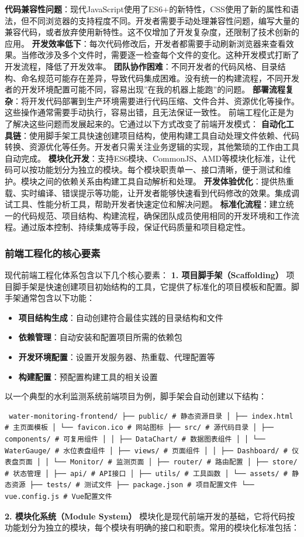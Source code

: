 \textbf{代码兼容性问题}：现代JavaScript使用了ES6+的新特性，CSS使用了新的属性和语法，但不同浏览器的支持程度不同。开发者需要手动处理兼容性问题，编写大量的兼容代码，或者放弃使用新特性。这不仅增加了开发复杂度，还限制了技术创新的应用。 \textbf{开发效率低下}：每次代码修改后，开发者都需要手动刷新浏览器来查看效果。当修改涉及多个文件时，需要逐一检查每个文件的变化。这种开发模式打断了开发流程，降低了开发效率。 \textbf{团队协作困难}：不同开发者的代码风格、目录结构、命名规范可能存在差异，导致代码集成困难。没有统一的构建流程，不同开发者的开发环境配置可能不同，容易出现''在我的机器上能跑''的问题。 \textbf{部署流程复杂}：将开发代码部署到生产环境需要进行代码压缩、文件合并、资源优化等操作。这些操作通常需要手动执行，容易出错，且无法保证一致性。 前端工程化正是为了解决这些问题而发展起来的。它通过以下方式改变了前端开发模式： \textbf{自动化工具链}：使用脚手架工具快速创建项目结构，使用构建工具自动处理文件依赖、代码转换、资源优化等任务。开发者只需关注业务逻辑的实现，其他繁琐的工作由工具自动完成。 \textbf{模块化开发}：支持ES6模块、CommonJS、AMD等模块化标准，让代码可以按功能划分为独立的模块。每个模块职责单一、接口清晰，便于测试和维护。模块之间的依赖关系由构建工具自动解析和处理。 \textbf{开发体验优化}：提供热重载、实时编译、错误提示等功能，让开发者能够快速看到代码修改的效果。集成调试工具、性能分析工具，帮助开发者快速定位和解决问题。 \textbf{标准化流程}：建立统一的代码规范、项目结构、构建流程，确保团队成员使用相同的开发环境和工作流程。通过版本控制、持续集成等手段，保证代码质量和项目稳定性。 \subsubsection{前端工程化的核心要素}\label{ux524dux7aefux5de5ux7a0bux5316ux7684ux6838ux5fc3ux8981ux7d20} 现代前端工程化体系包含以下几个核心要素： \textbf{1. 项目脚手架（Scaffolding）} 项目脚手架是快速创建项目初始结构的工具，它提供了标准化的项目模板和配置。脚手架通常包含以下功能： \begin{itemize} \item \textbf{项目结构生成}：自动创建符合最佳实践的目录结构和文件 \item \textbf{依赖管理}：自动安装和配置项目所需的依赖包 \item \textbf{开发环境配置}：设置开发服务器、热重载、代理配置等 \item \textbf{构建配置}：预配置构建工具的相关设置 \end{itemize} 以一个典型的水利监测系统前端项目为例，脚手架会自动创建以下结构： \begin{verbatim} water-monitoring-frontend/ ├── public/ # 静态资源目录 │ ├── index.html # 主页面模板 │ └── favicon.ico # 网站图标 ├── src/ # 源代码目录 │ ├── components/ # 可复用组件 │ │ ├── DataChart/ # 数据图表组件 │ │ └── WaterGauge/ # 水位表盘组件 │ ├── views/ # 页面组件 │ │ ├── Dashboard/ # 仪表盘页面 │ │ └── Monitor/ # 监测页面 │ ├── router/ # 路由配置 │ ├── store/ # 状态管理 │ ├── api/ # API接口 │ ├── utils/ # 工具函数 │ └── assets/ # 静态资源 ├── tests/ # 测试文件 ├── package.json # 项目配置文件 └── vue.config.js # Vue配置文件 \end{verbatim} \textbf{2. 模块化系统（Module System）} 模块化是现代前端开发的基础，它将代码按功能划分为独立的模块，每个模块有明确的接口和职责。常用的模块化标准包括： 